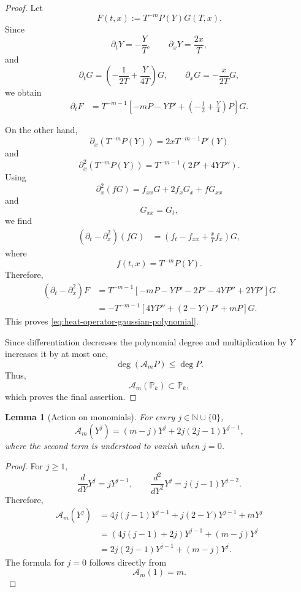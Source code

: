 \documentclass[11pt]{amsart}
\newtheorem{lemma}{Lemma}[section]
\theoremstyle{definition}
\theoremstyle{remark}
\numberwithin{equation}{section}
\newcommand{\N}{{\mathbb N}}
\begin{document}
\begin{proof}
Let
\[
F(t,x):=T^{-m}P(Y)G(T,x).
\]
Since
\[
\partial_tY=-\frac{Y}{T},
\qquad
\partial_xY=\frac{2x}{T},
\]
and
\[
\partial_tG
=
\left(
-\frac{1}{2T}+\frac{Y}{4T}
\right)G,
\qquad
\partial_xG=-\frac{x}{2T}G,
\]
we obtain
\begin{align}
\partial_tF
&=
T^{-m-1}
\left[
-mP-YP'
+
\left(
-\frac12+\frac Y4
\right)P
\right]G.
\label{eq:dt-gaussian-polynomial}
\end{align}

On the other hand,
\[
\partial_x\left(T^{-m}P(Y)\right)
=
2xT^{-m-1}P'(Y)
\]
and
\[
\partial_x^2\left(T^{-m}P(Y)\right)
=
T^{-m-1}
\left(
2P'+4YP''
\right).
\]
Using
\[
\partial_x^2(fG)
=
f_{xx}G+2f_xG_x+fG_{xx}
\]
and
\[
G_{xx}=G_t,
\]
we find
\begin{align*}
(\partial_t-\partial_x^2)(fG)
&=
\left(
f_t-f_{xx}+\frac{x}{T}f_x
\right)G,
\end{align*}
where
\[
f(t,x)=T^{-m}P(Y).
\]
Therefore,
\begin{align*}
(\partial_t-\partial_x^2)F
&=
T^{-m-1}
\left[
-mP-YP'
-2P'-4YP''
+2YP'
\right]G
\\
&=
-T^{-m-1}
\left[
4YP''+(2-Y)P'+mP
\right]G.
\end{align*}
This proves \eqref{eq:heat-operator-gaussian-polynomial}.

Since differentiation decreases the polynomial degree and multiplication
by $Y$ increases it by at most one,
\[
\deg(\mathcal A_mP)\le\deg P.
\]
Thus,
\[
\mathcal A_m(\mathbb P_k)\subset\mathbb P_k,
\]
which proves the final assertion.
\end{proof}

\begin{lemma}[Action on monomials]
\label{lem:Am-action-monomials}
For every $j\in\N\cup\{0\}$,
\begin{equation}\label{eq:Am-action-monomials}
\mathcal A_m(Y^j)
=
(m-j)Y^j
+
2j(2j-1)Y^{j-1},
\end{equation}
where the second term is understood to vanish when $j=0$.
\end{lemma}

\begin{proof}
For $j\ge1$,
\[
\frac{d}{dY}Y^j=jY^{j-1},
\qquad
\frac{d^2}{dY^2}Y^j=j(j-1)Y^{j-2}.
\]
Therefore,
\begin{align*}
\mathcal A_m(Y^j)
&=
4j(j-1)Y^{j-1}
+
j(2-Y)Y^{j-1}
+
mY^j
\\
&=
\left(
4j(j-1)+2j
\right)Y^{j-1}
+
(m-j)Y^j
\\
&=
2j(2j-1)Y^{j-1}
+
(m-j)Y^j.
\end{align*}
The formula for $j=0$ follows directly from
\[
\mathcal A_m(1)=m.
\]
\end{proof}
\end{document}
